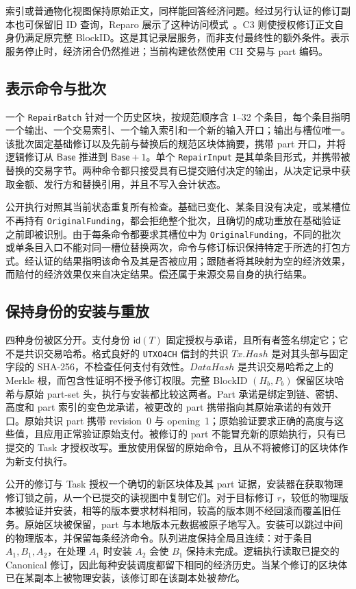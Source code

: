索引或普通物化视图保持原始正文，同样能回答经济问题。经过另行认证的修订副本也可保留旧 ID 查询，Reparo 展示了这种访问模式~\cite{reparo}。C3 则使授权修订正文自身仍满足原完整 BlockID。这是其记录层服务，而非支付最终性的额外条件。表示服务停止时，经济闭合仍然推进；当前构建依然使用 CH 交易与 part 编码。

\subsection{表示命令与批次}
\label{sec:protocol-batch}

一个 \texttt{RepairBatch} 针对一个历史区块，按规范顺序含 1--32 个条目，每个条目指明一个输出、一个交易索引、一个输入索引和一个新的输入开口；输出与槽位唯一。该批次固定基础修订以及先前与替换后的规范区块体摘要，携带 part 开口，并将逻辑修订从 $\mathsf{Base}$ 推进到 $\mathsf{Base}+1$。单个 \texttt{RepairInput} 是其单条目形式，并携带被替换的交易字节。两种命令都只接受具有已提交赔付决定的输出，从决定记录中获取金额、发行方和替换引用，并且不写入会计状态。

公开执行对照其当前状态重复所有检查。基础已变化、某条目没有决定，或某槽位不再持有 \texttt{OriginalFunding}，都会拒绝整个批次，且确切的成功重放在基础验证之前即被识别。由于每条命令都要求其槽位中为 \texttt{OriginalFunding}，不同的批次或单条目入口不能对同一槽位替换两次，命令与修订标识保持特定于所选的打包方式。经认证的结果指明该命令及其是否被应用；跟随者将其映射为空的经济效果，而赔付的经济效果仅来自决定结果。偿还属于来源交易自身的执行结果。

\subsection{保持身份的安装与重放}
\label{sec:protocol-installation}

四种身份被区分开。支付身份 $\mathsf{id}(T)$ 固定授权与承诺，且所有者签名绑定它；它不是共识交易哈希。格式良好的 \texttt{UTXO4CH} 信封的共识 $\mathit{Tx.Hash}$ 是对其头部与固定字段的 SHA-256，不检查任何支付有效性。$\mathit{DataHash}$ 是共识交易哈希之上的 Merkle 根，而包含性证明不授予修订权限。完整 BlockID $(H_b,P_b)$ 保留区块哈希与原始 part-set 头，执行与安装都比较这两者。Part 承诺是绑定到链、密钥、高度和 part 索引的变色龙承诺，被更改的 part 携带指向其原始承诺的有效开口。原始共识 part 携带 revision~0 与 opening~1；原始验证要求正确的高度与这些值，且应用正常验证原始支付。被修订的 part 不能冒充新的原始执行，只有已提交的 Task 才授权改写。重放使用保留的原始命令，且从不将被修订的区块体作为新支付执行。

公开的修订与 Task 授权一个确切的新区块体及其 part 证据，安装器在获取物理修订锁之前，从一个已提交的读视图中复制它们。对于目标修订 $r$，较低的物理版本被验证并安装，相等的版本要求材料相同，较高的版本则不经回滚而覆盖旧任务。原始区块被保留，part 与本地版本元数据被原子地写入。安装可以跳过中间的物理版本，并保留每条经济命令。队列进度保持全局且连续：对于条目 $A_1,B_1,A_2$，在处理 $A_1$ 时安装 $A_2$ 会使 $B_1$ 保持未完成。逻辑执行读取已提交的 Canonical 修订，因此每种安装调度都留下相同的经济历史。当某个修订的区块体已在某副本上被物理安装，该修订即在该副本处被\emph{物化}。

